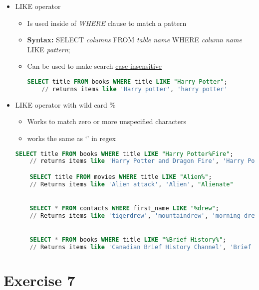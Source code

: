 \documentclass[12pt]{article}
\begin{document}
\begin{itemize}
    \item LIKE operator
    \begin{itemize}
        \item Is used inside of \textit{WHERE} clause to match a pattern
        \item \textbf{Syntax:} SELECT \textit{columns} FROM \textit{table name} WHERE \textit{column name} LIKE \textit{pattern};
        \item Can be used to make search \underline{case insensitive}

    \begin{lstlisting}[language=SQL]
    SELECT title FROM books WHERE title LIKE "Harry Potter";
    // returns items like 'Harry potter', 'harry potter'

    \end{lstlisting}
    \end{itemize}
    \item LIKE operator with wild card \%
    \begin{itemize}
        \item Works to match zero or more unspecified characters
        \item works the same as `\*' in regex
    \end{itemize}


    \begin{lstlisting}[language=SQL]
    SELECT title FROM books WHERE title LIKE "Harry Potter%Fire";
    // returns items like 'Harry Potter and Dragon Fire', 'Harry Potter and Fire', 'Harry Potter Rising Fire'

    SELECT title FROM movies WHERE title LIKE "Alien%";
    // Returns items like 'Alien attack', 'Alien', "Alienate"


    SELECT * FROM contacts WHERE first_name LIKE "%drew";
    // Returns items like 'tigerdrew', 'mountaindrew', 'morning drew', 'andrew'


    SELECT * FROM books WHERE title LIKE "%Brief History%";
    // Returns items like 'Canadian Brief History Channel', 'Brief History'
    \end{lstlisting}
\end{itemize}

\bigskip

\section{Exercise 7}
\end{document}
